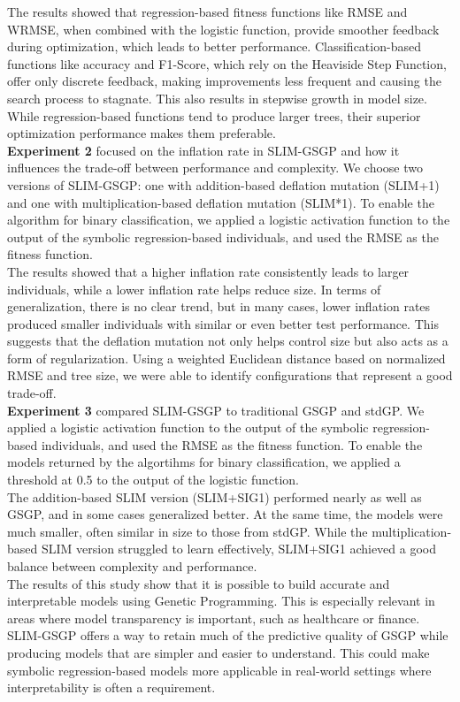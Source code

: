 \documentclass[manuscript, review, anonymous]{acmart} %
\begin{document}
The results showed that regression-based fitness functions like RMSE and WRMSE, 
when combined with the logistic function, provide smoother feedback during optimization, 
which leads to better performance. Classification-based functions like accuracy and F1-Score, 
which rely on the Heaviside Step Function, offer only discrete feedback, 
making improvements less frequent and causing the search process to stagnate. 
This also results in stepwise growth in model size. 
While regression-based functions tend to produce larger trees, their superior optimization performance makes them preferable.\\
\textbf{Experiment 2} focused on the inflation rate in SLIM-GSGP and how it influences the trade-off between performance and complexity.
We choose two versions of SLIM-GSGP: 
one with addition-based deflation mutation (SLIM+1) and one with multiplication-based deflation mutation (SLIM*1).
To enable the algorithm for binary classification, 
we applied a logistic activation function to the output of the symbolic regression-based individuals, 
and used the RMSE as the fitness function.\\
The results showed that a higher inflation rate consistently leads to larger individuals, 
while a lower inflation rate helps reduce size. In terms of generalization, 
there is no clear trend, but in many cases, 
lower inflation rates produced smaller individuals with similar or even better test performance. 
This suggests that the deflation mutation not only helps control size but also acts as a form of regularization. 
Using a weighted Euclidean distance based on normalized RMSE and tree size, 
we were able to identify configurations that represent a good trade-off.\\
\textbf{Experiment 3} compared SLIM-GSGP to traditional GSGP and stdGP.
We applied a logistic activation function to the output of the symbolic regression-based individuals, and used the RMSE as the fitness function.
To enable the models returned by the algortihms for binary classification,
we applied a threshold at 0.5 to the output of the logistic function.\\ 
The addition-based SLIM version (SLIM+SIG1) performed nearly as well as GSGP, 
and in some cases generalized better. At the same time, the models were much smaller, 
often similar in size to those from stdGP. While the multiplication-based SLIM version struggled to learn effectively, 
SLIM+SIG1 achieved a good balance between complexity and performance.\\
The results of this study show that it is possible to build accurate and interpretable models using Genetic Programming. 
This is especially relevant in areas where model transparency is important, 
such as healthcare or finance. 
SLIM-GSGP offers a way to retain much of the predictive quality of GSGP while producing models that are simpler and easier to understand. 
This could make symbolic regression-based models more applicable in real-world settings where interpretability is often a requirement.
\end{document}
